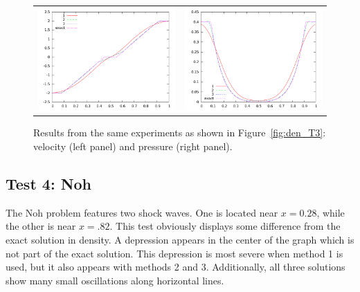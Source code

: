 \documentclass[10pt]{article}
\begin{document}
\begin{figure}
  \begin{center}
	\begin{tabular}{cc}
      \includegraphics[width=.475\textwidth]{vel_T3.png} &
	  \includegraphics[width=.475\textwidth]{prs_T3.png}
	\end{tabular}
  \end{center}
  \caption{Results from the same experiments as shown in Figure~\ref{fig:den_T3}:
  velocity (left panel) and pressure (right panel).}
\end{figure}

\clearpage

\subsection{Test 4: Noh}
The Noh problem features two shock waves. One is located near $x=0.28$, while the other is near $x=.82$.
This test obviously displays some difference from the exact solution in density. A depression appears in the center of the graph which is not part of the exact solution. This depression is most severe when method 1 is used, but it also appears with methods 2 and 3. Additionally, all three solutions show many small oscillations along horizontal lines. 
\end{document}
